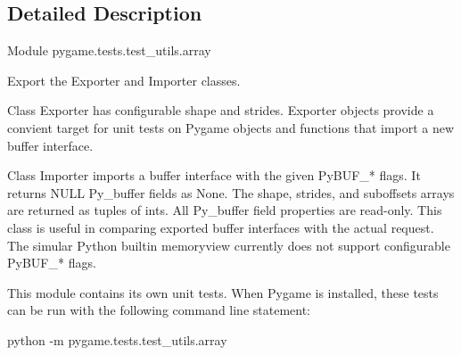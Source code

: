 \subsection{Detailed Description}
\begin{DoxyVerb}Module pygame.tests.test_utils.array

Export the Exporter and Importer classes.

Class Exporter has configurable shape and strides. Exporter objects
provide a convient target for unit tests on Pygame objects and functions that
import a new buffer interface.

Class Importer imports a buffer interface with the given PyBUF_* flags.
It returns NULL Py_buffer fields as None. The shape, strides, and suboffsets
arrays are returned as tuples of ints. All Py_buffer field properties are
read-only. This class is useful in comparing exported buffer interfaces
with the actual request. The simular Python builtin memoryview currently
does not support configurable PyBUF_* flags.

This module contains its own unit tests. When Pygame is installed, these tests
can be run with the following command line statement:

python -m pygame.tests.test_utils.array\end{DoxyVerb}
 